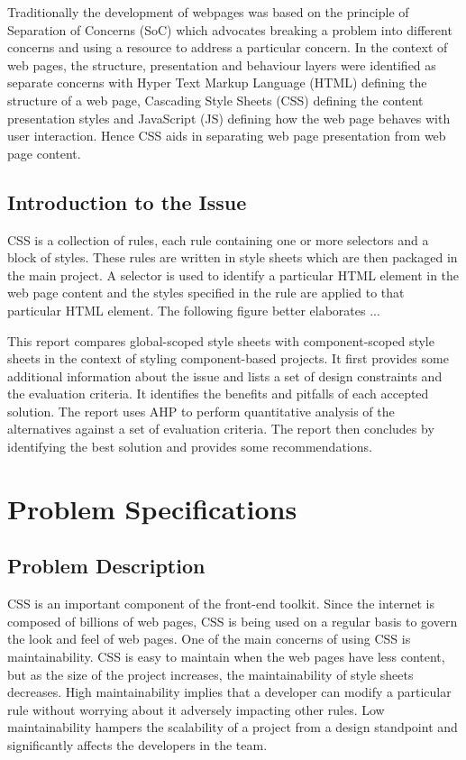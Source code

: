 \documentclass[12pt]{article}
\begin{document}
Traditionally the development of webpages was based on the principle of Separation of Concerns (SoC) which advocates breaking a problem into different concerns and using a resource to address a particular concern. In the context of web pages, the structure, presentation and behaviour layers were identified as separate concerns with Hyper Text Markup Language (HTML) defining the structure of a web page, Cascading Style Sheets (CSS) defining the content presentation styles and JavaScript (JS) defining how the web page behaves with user interaction. Hence CSS aids in separating web page presentation from web page content.


\subsection{Introduction to the Issue}
CSS is a collection of rules, each rule containing one or more selectors and a block of styles. These rules are written in style sheets which are then packaged in the main project. A selector is used to identify a particular HTML element in the web page content and the styles specified in the rule are applied to that particular HTML element. The following figure better elaborates ... 





This report compares global-scoped style sheets with component-scoped style sheets in the context of styling component-based projects. It first provides some additional information about the issue and lists a set of design constraints and the evaluation criteria. It identifies the benefits and pitfalls of each accepted solution. The report uses AHP to perform quantitative analysis of the alternatives against a set of evaluation criteria. The report then concludes by identifying the best solution and provides some recommendations.


\section{Problem Specifications}
\subsection{Problem Description}
CSS is an important component of the front-end toolkit. Since the internet is composed of billions of web pages, CSS is being used on a regular basis to govern the look and feel of web pages. One of the main concerns of using CSS is maintainability. CSS is easy to maintain when the web pages have less content, but as the size of the project increases, the maintainability of style sheets decreases. High maintainability implies that a developer can modify a particular rule without worrying about it adversely impacting other rules. Low maintainability hampers the scalability of a project from a design standpoint and significantly affects the developers in the team.
\end{document}
